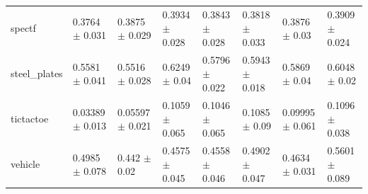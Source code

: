 \begin{tabular}{llllllll}
spectf & 0.3764 $\pm$ 0.031 & 0.3875 $\pm$ 0.029 & 0.3934 $\pm$ 0.028 & 0.3843 $\pm$ 0.028 & 0.3818 $\pm$ 0.033 & 0.3876 $\pm$ 0.03 & 0.3909 $\pm$ 0.024 \\
steel\_plates & 0.5581 $\pm$ 0.041 & 0.5516 $\pm$ 0.028 & 0.6249 $\pm$ 0.04 & 0.5796 $\pm$ 0.022 & 0.5943 $\pm$ 0.018 & 0.5869 $\pm$ 0.04 & 0.6048 $\pm$ 0.02 \\
tictactoe & 0.03389 $\pm$ 0.013 & 0.05597 $\pm$ 0.021 & 0.1059 $\pm$ 0.065 & 0.1046 $\pm$ 0.065 & 0.1085 $\pm$ 0.09 & 0.09995 $\pm$ 0.061 & 0.1096 $\pm$ 0.038 \\
vehicle & 0.4985 $\pm$ 0.078 & 0.442 $\pm$ 0.02 & 0.4575 $\pm$ 0.045 & 0.4558 $\pm$ 0.046 & 0.4902 $\pm$ 0.047 & 0.4634 $\pm$ 0.031 & 0.5601 $\pm$ 0.089 \\
\bottomrule
\end{tabular}
